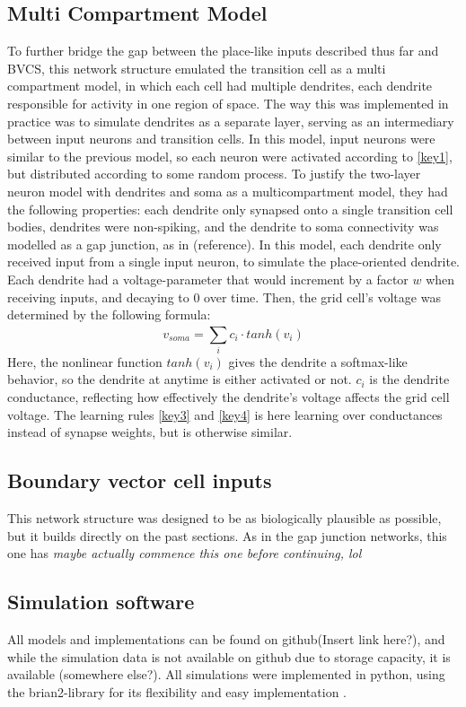 \documentclass{article}
\begin{document}
    \subsection{Multi Compartment Model}
    To further bridge the gap between the place-like inputs described thus far and BVCS, this network structure emulated the transition cell as a multi compartment model, in which each cell had multiple dendrites, each dendrite responsible for activity in one region of space. The way this was implemented in practice was to simulate dendrites as a separate layer, serving as an intermediary between input neurons and transition cells. In this model, input neurons were similar to the previous model, so each neuron were activated according to \ref*{key1}, but distributed according to some random process. To justify the two-layer neuron model with dendrites and soma as a multicompartment model, they had the following properties: each dendrite only synapsed onto a single transition cell bodies, dendrites were non-spiking, and the dendrite to soma connectivity was modelled as a gap junction, as in (reference). In this model, each dendrite only received input from a single input neuron, to simulate the place-oriented dendrite. Each dendrite had a voltage-parameter that would increment by a factor \(w\) when receiving inputs, and decaying to 0 over time. Then, the grid cell's voltage was determined by the following formula: \[ v_{soma} = \sum_{i}^{} c_i \cdot tanh(v_i)\] Here, the nonlinear function \(tanh(v_i)\) gives the dendrite a softmax-like behavior, so the dendrite at anytime is either activated or not. \(c_i\) is the dendrite conductance, reflecting how effectively the dendrite's voltage affects the grid cell voltage. The learning rules \ref*{key3} and \ref*{key4} is here learning over conductances instead of synapse weights, but is otherwise similar.

    \subsection{Boundary vector cell inputs}
    This network structure was designed to be as biologically plausible as possible, but it builds directly on the past sections. As in the gap junction networks, this one has \textit{maybe actually commence this one before continuing, lol}

    \subsection{Simulation software} All models and implementations can be found on github(Insert link here?), and while the simulation data is not available on github due to storage capacity, it is available (somewhere else?). All simulations were implemented in python, using the brian2-library for its flexibility and easy implementation \parencite{Brian2}. 
    
\end{document}
